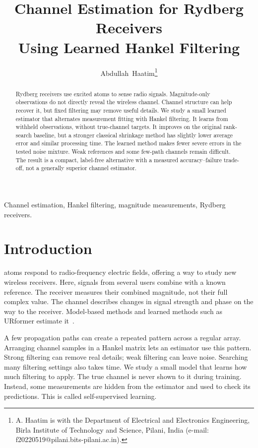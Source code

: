 \documentclass[journal]{IEEEtran}
\begin{document}
\title{Channel Estimation for Rydberg Receivers\\Using Learned Hankel Filtering}
\author{Abdullah~Haatim\thanks{A. Haatim is with the Department of Electrical and Electronics Engineering, Birla Institute of Technology and Science, Pilani, India (e-mail: f20220519@pilani.bits-pilani.ac.in).}}
\maketitle
\begin{abstract}
Rydberg receivers use excited atoms to sense radio signals. Magnitude-only
observations do not directly reveal the wireless channel. Channel structure
can help recover it, but fixed filtering may remove useful details. We
study a small learned estimator that alternates measurement fitting with
Hankel filtering. It learns from withheld observations, without true-channel
targets. It improves on the original rank-search baseline, but a stronger
classical shrinkage method has slightly lower average error and similar
processing time. The learned method makes fewer severe errors in the
tested noise mixture. Weak references and some few-path channels remain
difficult. The result is a compact, label-free alternative with a measured
accuracy--failure trade-off, not a generally superior channel estimator.
\end{abstract}
\begin{IEEEkeywords}
Channel estimation, Hankel filtering, magnitude measurements, Rydberg receivers.
\end{IEEEkeywords}

\section{Introduction}
 atoms respond to radio-frequency electric fields,
offering a way to study new wireless receivers. Here, signals from several
users combine with a known reference. The receiver measures their combined
magnitude, not their full complex value. The channel describes changes in
signal strength and phase on the way to the receiver. Model-based methods
and learned methods such as URformer estimate it~\cite{xu2025,xiao2026}.

A few propagation paths can create a repeated pattern across a regular
array. Arranging channel samples in a Hankel matrix lets an estimator use
this pattern. Strong filtering can remove real details; weak filtering can
leave noise. Searching many filtering settings also takes time. We study a
small model that learns how much filtering to apply. The true channel is
never shown to it during training. Instead, some measurements are hidden
from the estimator and used to check its predictions. This is called
self-supervised learning.
\end{document}
